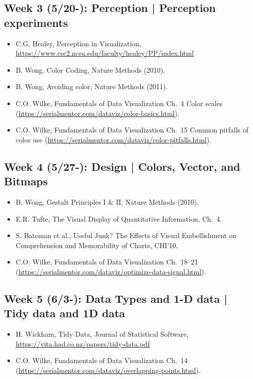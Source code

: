 \documentclass[11pt,article,oneside]{memoir} %
\begin{document}
\subsection{Week 3 (5/20-): Perception | Perception experiments }%

\begin{itemize}\itemsep0em 
\item C.G. Healey, Perception in Visualization, \url{https://www.csc2.ncsu.edu/faculty/healey/PP/index.html}
\item B. Wong, Color Coding, Nature Methods (2010).
\item B. Wong, Avoiding color, Nature Methods (2011). 
\item C.O. Wilke, Fundamentals of Data Visualization Ch.~4 Color scales (\url{https://serialmentor.com/dataviz/color-basics.html}). 
\item C.O. Wilke, Fundamentals of Data Visualization Ch.~15 Common pitfalls of color use (\url{https://serialmentor.com/dataviz/color-pitfalls.html}).
\end{itemize}	
\subsection{Week 4 (5/27-): Design | Colors, Vector, and Bitmaps }%

\begin{itemize}\itemsep0em 
\item B. Wong, Gestalt Principles I \& II, Nature Methods (2010). 
\item E.R. Tufte, The Visual Display of Quantitative Information, Ch.~4.
\item S. Bateman et al., Useful Junk? The Effects of Visual Embellishment on Comprehension and Memorability of Charts, CHI'10.
\item C.O. Wilke, Fundamentals of Data Visualization Ch.~18--21 (\url{https://serialmentor.com/dataviz/optimize-data-signal.html}). 
\end{itemize}	
\subsection{Week 5 (6/3-): Data Types and 1-D data | Tidy data and 1D data } %

\begin{itemize}\itemsep0em 
\item H. Wickham, Tidy Data, Journal of Statistical Software, \url{https://vita.had.co.nz/papers/tidy-data.pdf}
\item C.O. Wilke, Fundamentals of Data Visualization Ch.~14 (\url{https://serialmentor.com/dataviz/overlapping-points.html}). 
\end{itemize}	
\end{document}
